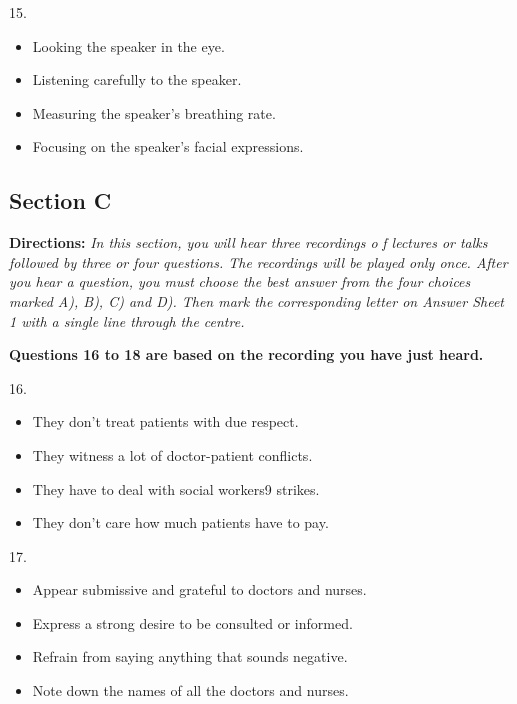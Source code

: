 \documentclass[UTF8,11pt]{ctexart}
\begin{document}
15.


\begin{itemize}[leftmargin=2em,itemsep=.2em,topsep=.4em]\item[A.] Looking the speaker in the eye.
\item[B.] Listening carefully to the speaker.
\item[C.] Measuring the speaker's breathing rate.
\item[D.] Focusing on the speaker's facial expressions.
\end{itemize}

\subsection*{\textbf{Section C}}


\textbf{Directions: }\textit{In this section, you will hear three recordings o} \textit{f lectures or talks followed by three} \textit{or four questions. The recordings will be played only once. After you hear a question, you must} \textit{choose the best answer from the four choices marked A), B), C) and D). Then mark the} \textit{corresponding letter on Answer Sheet 1 with a single line through the centre.}


\textbf{Questions 16 to 18 are based on the recording you have just heard.}


16.


\begin{itemize}[leftmargin=2em,itemsep=.2em,topsep=.4em]\item[A.] They don't treat patients with due respect.
\item[B.] They witness a lot of doctor-patient conflicts.
\end{itemize}

\begin{itemize}[leftmargin=2em,itemsep=.2em,topsep=.4em]\item[C.] They have to deal with social workers9 strikes.
\item[D.] They don't care how much patients have to pay.
\end{itemize}

17.


\begin{itemize}[leftmargin=2em,itemsep=.2em,topsep=.4em]\item[A.] Appear submissive and grateful to doctors and nurses.
\item[B.] Express a strong desire to be consulted or informed.
\item[C.] Refrain from saying anything that sounds negative.
\item[D.] Note down the names of all the doctors and nurses.
\end{itemize}
\end{document}
